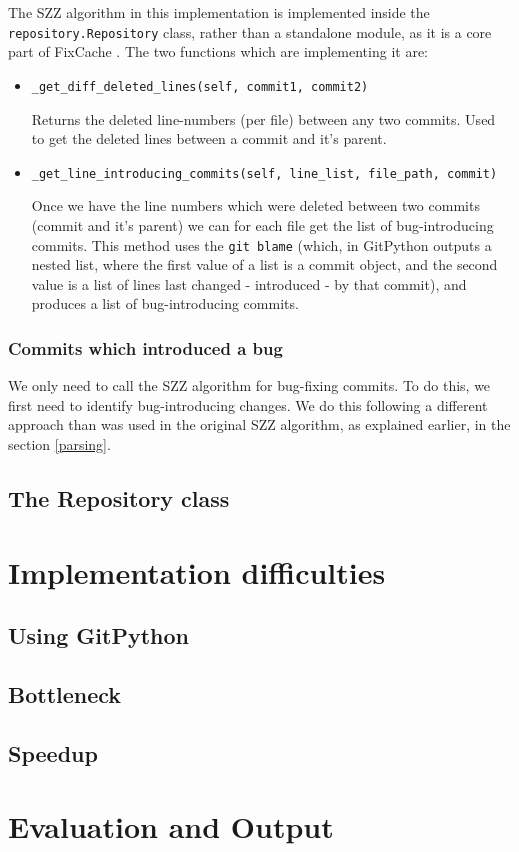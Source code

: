 \documentclass[12pt,twoside,notitlepage]{report}
\newcommand{\fxch}{FixCache }
\begin{document}
The SZZ algorithm in this implementation is implemented inside the \texttt{repository.Repository} class, rather than a standalone module, as it is a core part of \fxch. The two functions which are implementing it are:
\begin{itemize}
\item \texttt{\_get\_diff\_deleted\_lines(self, commit1, commit2)}

Returns the deleted line-numbers (per file) between any two commits. Used to get the deleted lines between a commit and it's parent.
\clearpage
\item \texttt{\_get\_line\_introducing\_commits(self, line\_list, file\_path, commit)}

Once we have the line numbers which were deleted between two commits (commit and it's parent) we can for each file get the list of bug-introducing commits. This method uses the \texttt{git blame} (which, in GitPython outputs a nested list, where the first value of a list is a commit object, and the second value is a list of lines last changed - introduced - by that commit), and produces a list of bug-introducing commits.
\end{itemize}
\subsubsection*{Commits which introduced a bug}
We only need to call the SZZ algorithm for bug-fixing commits. To do this, we first need to identify bug-introducing changes. We do this following a different approach than was used in the original SZZ algorithm, as explained earlier, in the section \ref{parsing}.
\subsection{The Repository class}
\section{Implementation difficulties}
\subsection{Using GitPython}
\subsection{Bottleneck}
\subsection{Speedup}
\section{Evaluation and Output}

\end{document}
